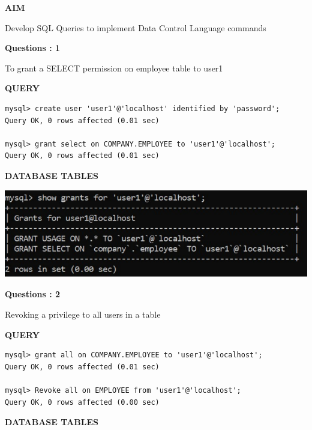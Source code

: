 \documentclass[a4paper,12pt]{report}
\begin{document}
	\begin{flushleft}
		\textbf{AIM }
	\end{flushleft} 
	   Develop SQL Queries to implement Data Control Language commands
\begin{flushleft}
    \textbf{Questions : 1}
\end{flushleft}
 To grant a SELECT permission on employee table to user1
	
	\begin{flushleft}
		\textbf{QUERY }
	\end{flushleft}
\begin{verbatim}
mysql> create user 'user1'@'localhost' identified by 'password';
Query OK, 0 rows affected (0.01 sec)

mysql> grant select on COMPANY.EMPLOYEE to 'user1'@'localhost';
Query OK, 0 rows affected (0.01 sec)

\end{verbatim}
\begin{flushleft}
		\textbf{DATABASE TABLES} 
\end{flushleft} 

\includegraphics[scale=1.1]{SELECT.png}

\begin{flushleft}
    \textbf{Questions : 2}
\end{flushleft}
Revoking a privilege to all users in a table
	\begin{flushleft}
		\textbf{QUERY }
	\end{flushleft}
\begin{verbatim}
mysql> grant all on COMPANY.EMPLOYEE to 'user1'@'localhost';
Query OK, 0 rows affected (0.01 sec)

mysql> Revoke all on EMPLOYEE from 'user1'@'localhost';
Query OK, 0 rows affected (0.00 sec)

\end{verbatim}
\begin{flushleft}
		\textbf{DATABASE TABLES} 
\end{flushleft} 
\end{document}
